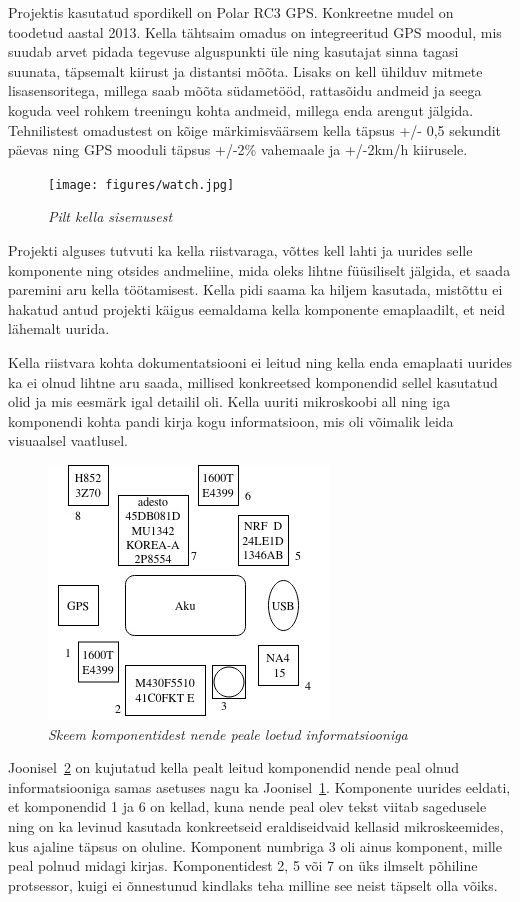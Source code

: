 
Projektis kasutatud spordikell on Polar RC3 GPS.
Konkreetne mudel on toodetud aastal 2013.
Kella tähtsaim omadus on integreeritud GPS moodul, mis suudab arvet pidada tegevuse alguspunkti üle ning kasutajat sinna tagasi suunata, täpsemalt kiirust ja distantsi mõõta.
Lisaks on kell ühilduv mitmete lisasensoritega, millega saab mõõta südametööd, rattasõidu andmeid ja seega koguda veel rohkem treeningu kohta andmeid, millega enda arengut jälgida.
Tehnilistest omadustest on kõige märkimisväärsem kella täpsus +/- 0,5 sekundit päevas ning GPS mooduli täpsus +/-2\% vahemaale ja +/-2km/h kiirusele.\cite{rc3-man}

\begin{figure}[ht]
    \centering
    \texttt{[image: figures/watch.jpg]}
    \caption{\textit{Pilt kella sisemusest}}
    \label{fig:watch}
\end{figure}

Projekti alguses tutvuti ka kella riistvaraga, võttes kell lahti ja uurides selle komponente ning otsides andmeliine, mida oleks lihtne füüsiliselt jälgida, et saada paremini aru kella töötamisest.
Kella pidi saama ka hiljem kasutada, mistõttu ei hakatud antud projekti käigus eemaldama kella komponente emaplaadilt, et neid lähemalt uurida.

Kella riistvara kohta dokumentatsiooni ei leitud ning kella enda emaplaati uurides ka ei olnud lihtne aru saada, millised konkreetsed komponendid sellel kasutatud olid ja mis eesmärk igal detailil oli.
Kella uuriti mikroskoobi all ning iga komponendi kohta pandi kirja kogu informatsioon, mis oli võimalik leida visuaalsel vaatlusel.

\begin{figure}[ht]
    \centering
    \includegraphics[width=.5\textwidth]{figures/kella-komponendid.jpg}
    \caption{\textit{Skeem komponentidest nende peale loetud informatsiooniga}}
    \label{fig:components}
\end{figure}

Joonisel~\ref{fig:components} on kujutatud kella pealt leitud komponendid nende peal olnud informatsiooniga samas asetuses nagu ka Joonisel~\ref{fig:watch}.
Komponente uurides eeldati, et komponendid 1 ja 6 on kellad, kuna nende peal olev tekst viitab sagedusele ning on ka levinud kasutada konkreetseid eraldiseidvaid kellasid mikroskeemides, kus ajaline täpsus on oluline.
Komponent numbriga 3 oli ainus komponent, mille peal polnud midagi kirjas.
Komponentidest 2, 5 või 7 on üks ilmselt põhiline protsessor, kuigi ei õnnestunud kindlaks teha milline see neist täpselt olla võiks.
